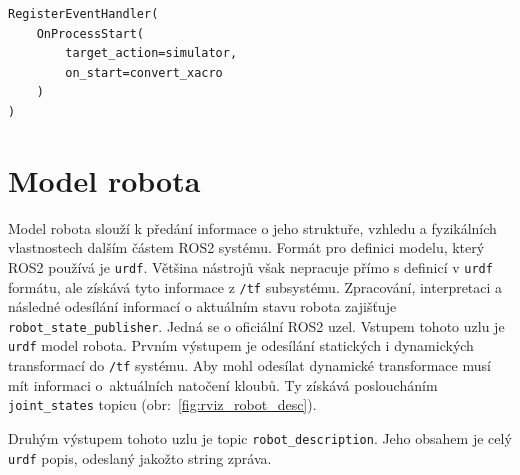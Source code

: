 \begin{verbatim}
RegisterEventHandler(
    OnProcessStart(
        target_action=simulator,
        on_start=convert_xacro
    )
)
\end{verbatim}

\section{Model robota} \label{implementation:model}
Model robota slouží k předání informace o jeho struktuře, vzhledu a fyzikálních vlastnostech dalším částem ROS2 systému. Formát pro definici modelu, který ROS2 používá je \verb|urdf|. Většina nástrojů však nepracuje přímo s definicí v \verb|urdf| formátu, ale získává tyto informace z \verb|/tf| subsystému. Zpracování, interpretaci a následné odesílání informací o aktuálním stavu robota zajišťuje \verb|robot_state_publisher|. Jedná se o oficiální ROS2 uzel. Vstupem tohoto uzlu je \verb|urdf| model robota. Prvním výstupem je odesílání statických i dynamických transformací do \verb|/tf| systému. Aby mohl odesílat dynamické transformace musí mít informaci o~aktuálních natočení kloubů. Ty získává posloucháním \verb|joint_states| topicu (obr:~\ref{fig:rviz_robot_desc}).

Druhým výstupem tohoto uzlu je topic \verb|robot_description|. Jeho obsahem je celý \verb|urdf| popis, odeslaný jakožto string zpráva.

